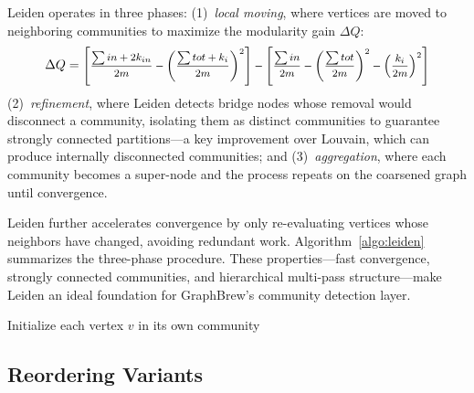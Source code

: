 \documentclass[sigconf, nonacm]{acmart}
\begin{document}
Leiden operates in three phases: (1)~\emph{local moving}, where vertices are moved to neighboring communities to maximize the modularity gain $\Delta Q$:
\begin{equation} \label{eqn:dQ}
{
\Delta Q = \text{\footnotesize $ \left[\frac{\sum in+2k_{in}}{2m} - \left(\frac{\sum tot+k_i}{2m}\right)^2\right]-\left[\frac{\sum in}{2m}-\left(\frac{\sum tot}{2m}\right)^2-\left(\frac{k_i}{2m}\right)^2 \right] $}
}
\end{equation}
(2)~\emph{refinement}, where Leiden detects bridge nodes whose removal would disconnect a community, isolating them as distinct communities to guarantee strongly connected partitions---a key improvement over Louvain, which can produce internally disconnected communities; and (3)~\emph{aggregation}, where each community becomes a super-node and the process repeats on the coarsened graph until convergence.

Leiden further accelerates convergence by only re-evaluating vertices whose neighbors have changed, avoiding redundant work. Algorithm~\ref{algo:leiden} summarizes the three-phase procedure. These properties---fast convergence, strongly connected communities, and hierarchical multi-pass structure---make Leiden an ideal foundation for GraphBrew's community detection layer.

\begin{algorithm}[t]
\SetAlgoLined
{}
\BlankLine
Initialize each vertex $v$ in its own community\;
\;
\caption{\textsc{Leiden} community detection (used as Stage~1 in GraphBrew).}
\label{algo:leiden}
\end{algorithm}

\subsection{Reordering Variants}
\label{sec:multilayer}
\end{document}
